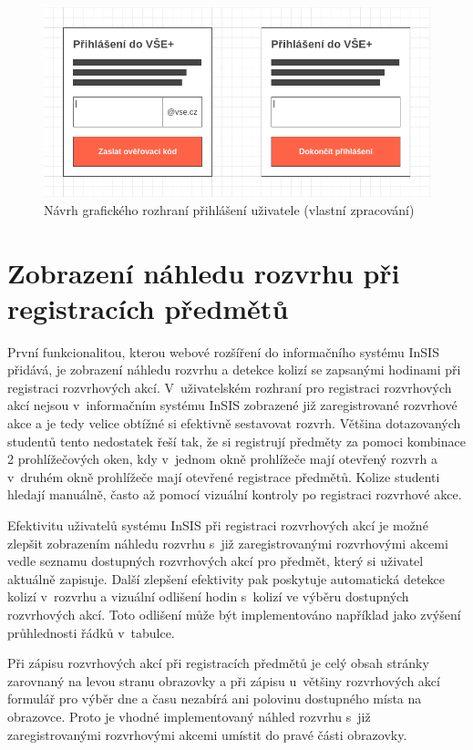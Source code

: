 \begin{figure}[htbp!]\centering
    \includegraphics[width=\textwidth]{img/wireframe-autentikace.png}
    \caption{Návrh grafického rozhraní přihlášení uživatele (vlastní zpracování)}
    \label{fig:autentikace-wireframe}
\end{figure}

\section{Zobrazení náhledu rozvrhu při registracích předmětů}

První funkcionalitou, kterou webové rozšíření do informačního systému InSIS přidává, je zobrazení náhledu rozvrhu a detekce kolizí se zapsanými hodinami při registraci rozvrhových akcí. V~uživatelském rozhraní pro registraci rozvrhových akcí nejsou v~informačním systému InSIS zobrazené již zaregistrované rozvrhové akce a je tedy velice obtížné si efektivně sestavovat rozvrh. Většina dotazovaných studentů tento nedostatek řeší tak, že si registrují předměty za pomoci kombinace 2 prohlížečových oken, kdy v~jednom okně prohlížeče mají otevřený rozvrh a v~druhém okně prohlížeče mají otevřené registrace předmětů. Kolize studenti hledají manuálně, často až pomocí vizuální kontroly po registraci rozvrhové akce.

Efektivitu uživatelů systému InSIS při registraci rozvrhových akcí je možné zlepšit zobrazením náhledu rozvrhu s~již zaregistrovanými rozvrhovými akcemi vedle seznamu dostupných rozvrhových akcí pro předmět, který si uživatel aktuálně zapisuje. Další zlepšení efektivity pak poskytuje automatická detekce kolizí v~rozvrhu a vizuální odlišení hodin s~kolizí ve výběru dostupných rozvrhových akcí. Toto odlišení může být implementováno například jako zvýšení průhlednosti řádků v~tabulce. 

Při zápisu rozvrhových akcí při registracích předmětů je celý obsah stránky zarovnaný na levou stranu obrazovky a při zápisu u~většiny rozvrhových akcí formulář pro výběr dne a času nezabírá ani polovinu dostupného místa na obrazovce. Proto je vhodné implementovaný náhled rozvrhu s~již zaregistrovanými rozvrhovými akcemi umístit do pravé části obrazovky.

